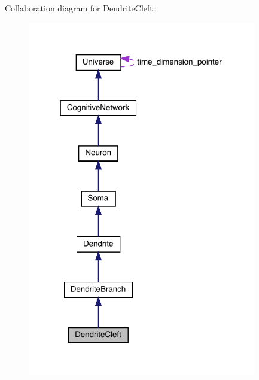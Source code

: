 Collaboration diagram for Dendrite\+Cleft\+:
\nopagebreak
\begin{figure}[H]
\begin{center}
\leavevmode
\includegraphics[width=283pt]{class_dendrite_cleft__coll__graph}
\end{center}
\end{figure}
